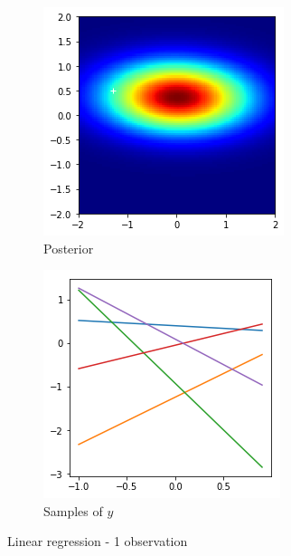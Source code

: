 \documentclass{article}
\begin{document}
\begin{figure}[H]
	\centering
	\begin{subfigure}[t]{0.3\linewidth}
		\includegraphics[width=\linewidth]{1-posterior}
		\caption{Posterior}
		\label{fig:1-p}
	\end{subfigure}
	\begin{subfigure}[t]{0.3\linewidth}
		\includegraphics[width=\linewidth]{1-samples}
		\caption{Samples of $y$}
		\label{fig:1-s}
	\end{subfigure}
	\caption{Linear regression - 1 observation}
	\label{fig:1-s}
\end{figure}
\end{document}
